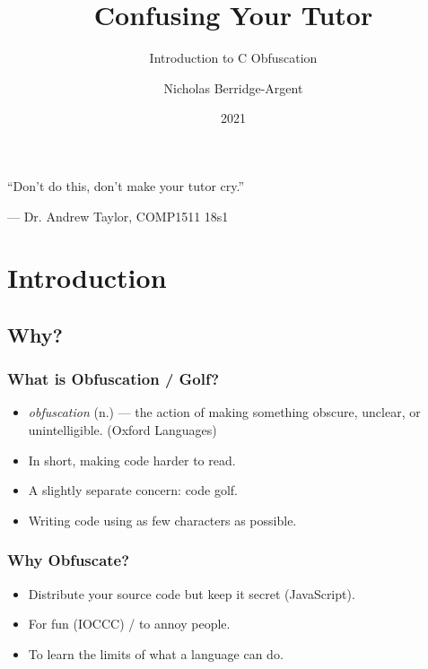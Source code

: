 \documentclass[handout,xcolor]{beamer}
\author{Nicholas Berridge-Argent}
\title{Confusing Your Tutor}
\subtitle{Introduction to C Obfuscation}
\date{2021}
\begin{document}
\begin{frame}
	\titlepage
\end{frame}


\begin{frame}
	\begin{center}
		``Don't do this, don't make your tutor cry.''
		
		\hspace{2cm}--- Dr. Andrew Taylor, COMP1511 18s1
	\end{center}
\end{frame}

\section{Introduction}

\subsection{Why?}

\begin{frame}
	\frametitle{What is Obfuscation / Golf?}
	\pause
	
	\begin{itemize}
		\item \textit{obfuscation} (n.) --- the action of making something obscure, unclear, or unintelligible. (Oxford Languages)
		\pause
		\item In short, making code harder to read.
		\pause
		\item A slightly separate concern: code golf.
		\pause
		\item Writing code using as few characters as possible.
	\end{itemize}
\end{frame}

\begin{frame}
	\frametitle{Why Obfuscate?}
	\pause
	
	\begin{itemize}
		\item Distribute your source code but keep it secret (JavaScript).
		\pause
		\item For fun (IOCCC) / to annoy people.
		\pause
		\item To learn the limits of what a language can do.
	\end{itemize}
\end{frame}
\end{document}
